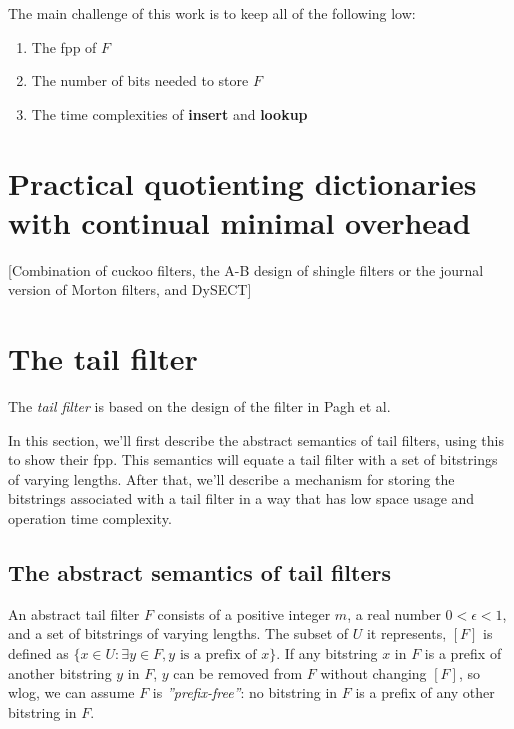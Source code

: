\documentclass[11pt,letterpaper]{article}
\begin{document}
The main challenge of this work is to keep all of the following low:

\begin{enumerate}
\item The fpp of $F$
\item The number of bits needed to store $F$
\item The time complexities of {\bf insert} and {\bf lookup}
\end{enumerate}

\section{Practical quotienting dictionaries with continual minimal overhead}

[Combination of cuckoo filters, the A-B design of shingle filters or the journal version of Morton filters, and DySECT]

\section{The tail filter}

The {\em tail filter} is based on the design of the filter in Pagh et al.~\cite{DBLP:journals/corr/abs-1304-1188}

In this section, we'll first describe the abstract semantics of tail filters, using this to show their fpp.
This semantics will equate a tail filter with a set of bitstrings of varying lengths.
After that, we'll describe a mechanism for storing the bitstrings associated with a tail filter in a way that has low space usage and operation time complexity.

\subsection{The abstract semantics of tail filters}

An abstract tail filter $F$ consists of a positive integer $m$, a real number $0 < \epsilon < 1$, and a set of bitstrings of varying lengths. %
The subset of $U$ it represents, $[F]$ is defined as $\{x \in U : \exists y \in F, y \textrm{ is a prefix of } x\}$.
If any bitstring $x$ in $F$ is a prefix of another bitstring $y$ in $F$, $y$ can be removed from $F$ without changing $[F]$, so wlog, we can assume $F$ is {\em ''prefix-free''}: no bitstring in $F$ is a prefix of any other bitstring in $F$.
\end{document}

